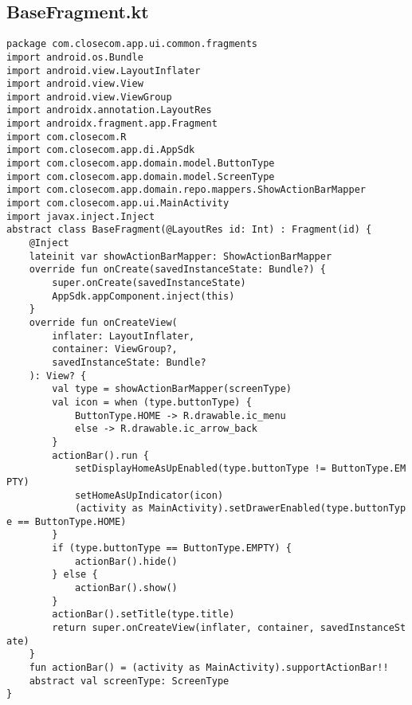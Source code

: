 \documentclass[listing]{espd}
\begin{document}
\subsection{BaseFragment.kt}
\begin{verbatim}
package com.closecom.app.ui.common.fragments
import android.os.Bundle
import android.view.LayoutInflater
import android.view.View
import android.view.ViewGroup
import androidx.annotation.LayoutRes
import androidx.fragment.app.Fragment
import com.closecom.R
import com.closecom.app.di.AppSdk
import com.closecom.app.domain.model.ButtonType
import com.closecom.app.domain.model.ScreenType
import com.closecom.app.domain.repo.mappers.ShowActionBarMapper
import com.closecom.app.ui.MainActivity
import javax.inject.Inject
abstract class BaseFragment(@LayoutRes id: Int) : Fragment(id) {
    @Inject
    lateinit var showActionBarMapper: ShowActionBarMapper
    override fun onCreate(savedInstanceState: Bundle?) {
        super.onCreate(savedInstanceState)
        AppSdk.appComponent.inject(this)
    }
    override fun onCreateView(
        inflater: LayoutInflater,
        container: ViewGroup?,
        savedInstanceState: Bundle?
    ): View? {
        val type = showActionBarMapper(screenType)
        val icon = when (type.buttonType) {
            ButtonType.HOME -> R.drawable.ic_menu
            else -> R.drawable.ic_arrow_back
        }
        actionBar().run {
            setDisplayHomeAsUpEnabled(type.buttonType != ButtonType.EM
PTY)
            setHomeAsUpIndicator(icon)
            (activity as MainActivity).setDrawerEnabled(type.buttonTyp
e == ButtonType.HOME)
        }
        if (type.buttonType == ButtonType.EMPTY) {
            actionBar().hide()
        } else {
            actionBar().show()
        }
        actionBar().setTitle(type.title)
        return super.onCreateView(inflater, container, savedInstanceSt
ate)
    }
    fun actionBar() = (activity as MainActivity).supportActionBar!!
    abstract val screenType: ScreenType
}
\end{verbatim}
\end{document}
